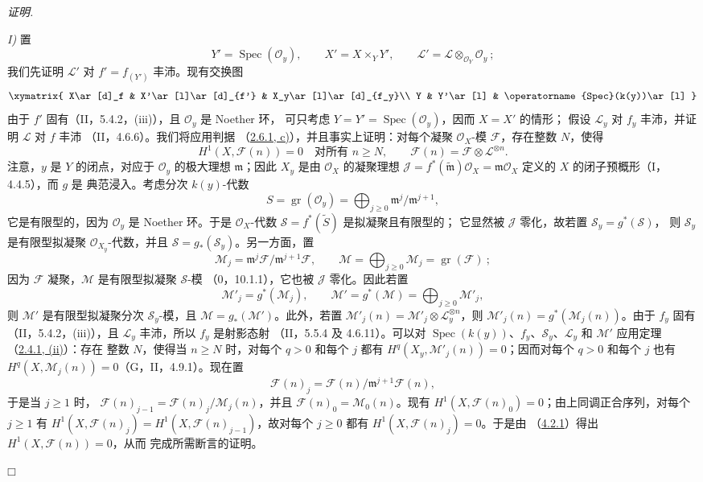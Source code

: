 \documentclass[UTF8,fontset=none,11pt,oneside,openany]{ctexbook}
\providecommand{\square}{\mdlgwhtsquare}
\newenvironment{proof}{%
  \par\smallskip\noindent\textit{证明.}\ %
}{\hfill$\square$\par}
\begin{document}
\begin{proof}
\noindent\textit{I)} 置
\[
Y'=\operatorname{Spec}(\mathcal O_y),\qquad
X'=X\times_YY',\qquad
\mathcal L'=\mathcal L\otimes_{\mathcal O_Y}\mathcal O_y~;
\]
我们先证明 $\mathcal L'$ 对 $f'=f_{(Y')}$ 丰沛。现有交换图
\[
\xymatrix{
X\ar[d]_f & X'\ar[l]\ar[d]_{f'} & X_y\ar[l]\ar[d]_{f_y}\\
Y & Y'\ar[l] & \operatorname{Spec}(k(y))\ar[l]
}
\]
由于 $f'$ 固有（II，5.4.2，(iii)），且 $\mathcal O_y$ 是 Noether 环，
可只考虑 $Y=Y'=\operatorname{Spec}(\mathcal O_y)$，因而 $X=X'$ 的情形；
假设 $\mathcal L_y$ 对 $f_y$ 丰沛，并证明 $\mathcal L$ 对 $f$ 丰沛
（II，4.6.6）。我们将应用判据
（\hyperref[III.2.6.1-fr]{2.6.1, c)}），并且事实上证明：对每个凝聚
$\mathcal O_X$-模 $\mathcal F$，存在整数 $N$，使得
\[
H^1(X,\mathcal F(n))=0\quad\text{对所有 }n\geq N,
\qquad
\mathcal F(n)=\mathcal F\otimes\mathcal L^{\otimes n}.
\]
注意，$y$ 是 $Y$ 的闭点，对应于 $\mathcal O_y$ 的极大理想
$\mathfrak m$；因此 $X_y$ 是由 $\mathcal O_X$ 的凝聚理想
$\mathcal J=f^*(\widetilde{\mathfrak m})\mathcal O_X=
\mathfrak m\mathcal O_X$ 定义的 $X$ 的闭子预概形（I，4.4.5），而 $g$ 是
典范浸入。考虑分次 $k(y)$-代数
\[
S=\operatorname{gr}(\mathcal O_y)
=\bigoplus_{j\geq0}\mathfrak m^j/\mathfrak m^{j+1},
\]
它是有限型的，因为 $\mathcal O_y$ 是 Noether 环。于是
$\mathcal O_X$-代数 $\mathcal S=f^*(\widetilde S)$ 是拟凝聚且有限型的；
它显然被 $\mathcal J$ 零化，故若置 $\mathcal S_y=g^*(\mathcal S)$，
则 $\mathcal S_y$ 是有限型拟凝聚 $\mathcal O_{X_y}$-代数，并且
$\mathcal S=g_*(\mathcal S_y)$。另一方面，置
\[
\mathcal M_j=\mathfrak m^j\mathcal F/\mathfrak m^{j+1}\mathcal F,
\qquad
\mathcal M=\bigoplus_{j\geq0}\mathcal M_j
=\operatorname{gr}(\mathcal F)~;
\]
因为 $\mathcal F$ 凝聚，$\mathcal M$ 是有限型拟凝聚 $\mathcal S$-模
（0，10.1.1），它也被 $\mathcal J$ 零化。因此若置
\[
\mathcal M'_j=g^*(\mathcal M_j),\qquad
\mathcal M'=g^*(\mathcal M)=\bigoplus_{j\geq0}\mathcal M'_j,
\]
则 $\mathcal M'$ 是有限型拟凝聚分次 $\mathcal S_y$-模，且
$\mathcal M=g_*(\mathcal M')$。此外，若置
$\mathcal M'_j(n)=\mathcal M'_j\otimes\mathcal L_y^{\otimes n}$，则
$\mathcal M'_j(n)=g^*(\mathcal M_j(n))$。由于 $f_y$ 固有
（II，5.4.2，(iii)），且 $\mathcal L_y$ 丰沛，所以 $f_y$ 是射影态射
（II，5.5.4 及 4.6.11）。可以对
$\operatorname{Spec}(k(y))$、$f_y$、$\mathcal S_y$、$\mathcal L_y$ 和
$\mathcal M'$ 应用定理（\hyperref[III.2.4.1-fr]{2.4.1, (ii)}）：存在
整数 $N$，使得当 $n\geq N$ 时，对每个 $q>0$ 和每个 $j$ 都有
$H^q(X_y,\mathcal M'_j(n))=0$；因而对每个 $q>0$ 和每个 $j$ 也有
$H^q(X,\mathcal M_j(n))=0$（G，II，4.9.1）。现在置
\[
\mathcal F(n)_j=\mathcal F(n)/\mathfrak m^{j+1}\mathcal F(n),
\]
于是当 $j\geq1$ 时，
$\mathcal F(n)_{j-1}=\mathcal F(n)_j/\mathcal M_j(n)$，并且
$\mathcal F(n)_0=\mathcal M_0(n)$。现有
$H^1(X,\mathcal F(n)_0)=0$；由上同调正合序列，对每个 $j\geq1$ 有
$H^1(X,\mathcal F(n)_j)=H^1(X,\mathcal F(n)_{j-1})$，故对每个
$j\geq0$ 都有 $H^1(X,\mathcal F(n)_j)=0$。于是由
（\hyperref[III.4.2.1-fr]{4.2.1}）得出 $H^1(X,\mathcal F(n))=0$，从而
完成所需断言的证明。


\end{proof}
\end{document}
